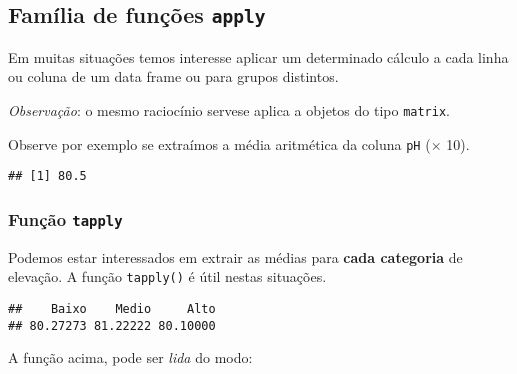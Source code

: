 \documentclass[
]{book}
\newenvironment{Shaded}{\begin{snugshade}}{\end{snugshade}}
\newcommand{\CommentTok}[1]{\textcolor[rgb]{0.56,0.35,0.01}{\textit{#1}}}
\newcommand{\FunctionTok}[1]{\textcolor[rgb]{0.00,0.00,0.00}{#1}}
\newcommand{\NormalTok}[1]{#1}
\newcommand{\SpecialCharTok}[1]{\textcolor[rgb]{0.00,0.00,0.00}{#1}}
\begin{document}
\hypertarget{famuxedlia-de-funuxe7uxf5es-apply}{%
\subsection{\texorpdfstring{Família de funções \texttt{apply}}{Família de funções apply}}\label{famuxedlia-de-funuxe7uxf5es-apply}}

Em muitas situações temos interesse aplicar um determinado cálculo a cada linha ou coluna de um data frame ou para grupos distintos.

\emph{Observação}: o mesmo raciocínio servese aplica a objetos do tipo \texttt{matrix}.

Observe por exemplo se extraímos a média aritmética da coluna \texttt{pH} (\(\times\) 10).

\begin{Shaded}
\end{Shaded}

\begin{verbatim}
## [1] 80.5
\end{verbatim}

\hypertarget{funuxe7uxe3o-tapply}{%
\subsubsection*{\texorpdfstring{Função \texttt{tapply}}{Função tapply}}\label{funuxe7uxe3o-tapply}}

Podemos estar interessados em extrair as médias para \textbf{cada categoria} de elevação. A função \texttt{tapply()} é útil nestas situações.

\begin{Shaded}
\end{Shaded}

\begin{verbatim}
##    Baixo    Medio     Alto 
## 80.27273 81.22222 80.10000
\end{verbatim}

A função acima, pode ser \emph{lida} do modo:
\end{document}
